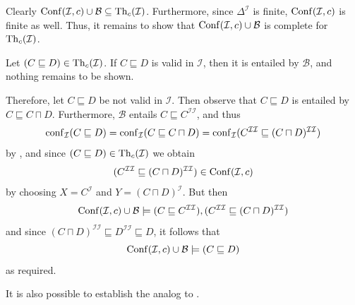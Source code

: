 \begin{Proof}
  Clearly $\operatorname{Conf}(\mathcal{I}, c) \cup \mathcal{B} \subseteq \operatorname{Th}_c(\mathcal{I})$.
  Furthermore, since $\Delta^{\mathcal{I}}$ is finite, $\operatorname{Conf}(\mathcal{I}, c)$ is finite
  as well.  Thus, it remains to show that $\operatorname{Conf}(\mathcal{I}, c) \cup \mathcal{B}$ is
  complete for $\operatorname{Th}_c(\mathcal{I})$.

  Let $(C \sqsubseteq D) \in \operatorname{Th}_c(\mathcal{I})$.  If $C \sqsubseteq D$ is valid in
  $\mathcal{I}$, then it is entailed by $\mathcal{B}$, and nothing remains to be shown.

  Therefore, let $C \sqsubseteq D$ be not valid in $\mathcal{I}$.  Then observe that $C
  \sqsubseteq D$ is entailed by $C \sqsubseteq C \sqcap D$.  Furthermore, $\mathcal{B}$
  entails $C \sqsubseteq C^{\mathcal{I}\mathcal{I}}$, and thus
  \begin{equation*}
    \operatorname{conf}_{\mathcal{I}}( C \sqsubseteq D ) = \operatorname{conf}_{\mathcal{I}}( C \sqsubseteq C \sqcap D
    ) = \operatorname{conf}_{\mathcal{I}}( C^{\mathcal{I}\mathcal{I}} \sqsubseteq (C \sqcap
    D)^{\mathcal{I}\mathcal{I}} )
  \end{equation*}
  by , and since $(C \sqsubseteq D) \in
  \operatorname{Th}_c(\mathcal{I})$ we obtain
  \begin{equation*}
    (C^{\mathcal{I}\mathcal{I}} \sqsubseteq (C \sqcap D)^{\mathcal{I}\mathcal{I}}) \in
    \operatorname{Conf}(\mathcal{I}, c)
  \end{equation*}
  by choosing $X = C^{\mathcal{I}}$ and $Y = (C \sqcap D)^{\mathcal{I}}$.  But then
  \begin{equation*}
    \operatorname{Conf}(\mathcal{I}, c) \cup \mathcal{B} \models (C \sqsubseteq
    C^{\mathcal{I}\mathcal{I}}), (C^{\mathcal{I}\mathcal{I}} \sqsubseteq (C \sqcap
    D)^{\mathcal{I}\mathcal{I}})
  \end{equation*}
  and since $(C \sqcap D)^{\mathcal{I}\mathcal{I}} \sqsubseteq D^{\mathcal{I}\mathcal{I}}
  \sqsubseteq D$, it follows that
  \begin{equation*}
    \operatorname{Conf}(\mathcal{I}, c) \cup \mathcal{B} \models (C \sqsubseteq D)
  \end{equation*}
  as required.
\end{Proof}

It is also possible to establish the analog to .

